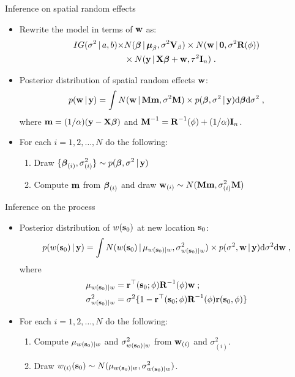 \begin{frame}{Inference on spatial random effects}
 
 \begin{itemize}\setlength{\itemsep}{0.4cm}
  \item Rewrite the model in terms of $\textbf{w}$ as:
 \begin{align*}
   IG(\sigma^2\,|\, a, b) \times & N(\mbox{\boldmath $ \beta $} \,|\, \mbox{\boldmath $\mu$}_{\beta}, \sigma^2\textbf{V}_{\beta}) \times N(\textbf{w}\,|\, \textbf{0}, \sigma^2 \textbf{R}(\phi)) \\
    &\times N(\textbf{y}\,|\, \textbf{X}\mbox{\boldmath $ \beta $}+\textbf{w}, \tau^2\textbf{I}_n)\; .
 \end{align*}

  \item Posterior distribution of spatial random effects $\textbf{w}$:
  \[
   p(\textbf{w}\,|\, \textbf{y}) = \int N(\textbf{w}\,|\, \textbf{M}\textbf{m},\sigma^2\textbf{M})\times p(\mbox{\boldmath $ \beta $},\sigma^2\,|\, \textbf{y}) \mbox{d}\mbox{\boldmath $ \beta $}\mbox{d}\sigma^2\;,
  \]
where $\displaystyle \textbf{m} = (1/\alpha)(\textbf{y}-\textbf{X}\mbox{\boldmath $ \beta $})$ and $\displaystyle \textbf{M}^{-1} = \textbf{R}^{-1}(\phi) + (1/\alpha)\textbf{I}_n$.

  \item For each $i=1,2,\ldots,N$ do the following: 
 \begin{enumerate}\setlength{\itemsep}{0.25cm}
  \item Draw $\displaystyle \{\mbox{\boldmath $ \beta $}_{(i)},\sigma^2_{(i)}\} \sim p(\mbox{\boldmath $ \beta $},\sigma^2\,|\, \textbf{y})$
  \item Compute $\textbf{m}$ from $\mbox{\boldmath $ \beta $}_{(i)}$ and draw $\displaystyle \textbf{w}_{(i)} \sim N(\textbf{M}\textbf{m}, \sigma^2_{(i)}\textbf{M})$
 \end{enumerate}
 \end{itemize}
 
\end{frame}


\begin{frame}{Inference on the process}
 
 \begin{itemize}\setlength{\itemsep}{0.4cm}
  \item Posterior distribution of $w(\textbf{s}_0)$ at new location $\textbf{s}_0$:
  \[
   p(w(\textbf{s}_0)\,|\, \textbf{y}) = \int N(w(\textbf{s}_0)\,|\, \mu_{w(\textbf{s}_0)|w}, \sigma^2_{w(\textbf{s}_0)|w})\times p(\sigma^2, \textbf{w} \,|\, \textbf{y}) \mbox{d}\sigma^2\mbox{d}\textbf{w}\;,
  \]
  where 
  \begin{align*}
    \mu_{w(\textbf{s}_0)|w} &= \textbf{r}^{\top}(\textbf{s}_0; \phi)\textbf{R}^{-1}(\phi)\textbf{w}\;; \\
    \sigma^2_{w(\textbf{s}_0)|w} &=  \sigma^2\{1-\textbf{r}^{\top}(\textbf{s}_0; \phi)\textbf{R}^{-1}(\phi)\textbf{r}(\textbf{s}_0,\phi)\}
  \end{align*}
  \item For each $i=1,2,\ldots,N$ do the following: 
 \begin{enumerate}\setlength{\itemsep}{0.25cm}
  \item Compute $ \mu_{w(\textbf{s}_0)|w}$ and $\sigma^2_{w(\textbf{s}_0)|w}$ from $\textbf{w}_{(i)}$ and $\sigma^2_{(i)}$. 
  \item Draw $\displaystyle w_{(i)}(\textbf{s}_0) \sim N(\mu_{w(\textbf{s}_0)|w}, \sigma^2_{w(\textbf{s}_0)|w})$.
 \end{enumerate}
 \end{itemize}
 
\end{frame}

